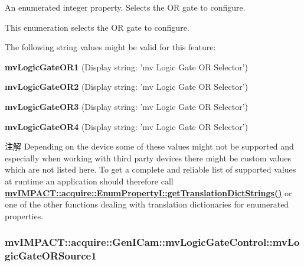 An enumerated integer property. Selects the O\+R gate to configure. 

This enumeration selects the O\+R gate to configure.

The following string values might be valid for this feature\+:
\begin{DoxyItemize}
\item {\bfseries mv\+Logic\+Gate\+O\+R1} (Display string\+: 'mv Logic Gate O\+R Selector')
\item {\bfseries mv\+Logic\+Gate\+O\+R2} (Display string\+: 'mv Logic Gate O\+R Selector')
\item {\bfseries mv\+Logic\+Gate\+O\+R3} (Display string\+: 'mv Logic Gate O\+R Selector')
\item {\bfseries mv\+Logic\+Gate\+O\+R4} (Display string\+: 'mv Logic Gate O\+R Selector')
\end{DoxyItemize}

\begin{DoxyNote}{注解}
Depending on the device some of these values might not be supported and especially when working with third party devices there might be custom values which are not listed here. To get a complete and reliable list of supported values at runtime an application should therefore call {\bfseries \hyperlink{classmv_i_m_p_a_c_t_1_1acquire_1_1_enum_property_i_a0ba6ccbf5ee69784d5d0b537924d26b6}{mv\+I\+M\+P\+A\+C\+T\+::acquire\+::\+Enum\+Property\+I\+::get\+Translation\+Dict\+Strings()}} or one of the other functions dealing with translation dictionaries for enumerated properties. 
\end{DoxyNote}
\hypertarget{classmv_i_m_p_a_c_t_1_1acquire_1_1_gen_i_cam_1_1mv_logic_gate_control_a7036f5051e1126c79f002edb61934005}{
\subsubsection[{mv\+Logic\+Gate\+O\+R\+Source1}]{ mv\+I\+M\+P\+A\+C\+T\+::acquire\+::\+Gen\+I\+Cam\+::mv\+Logic\+Gate\+Control\+::mv\+Logic\+Gate\+O\+R\+Source1}}\label{classmv_i_m_p_a_c_t_1_1acquire_1_1_gen_i_cam_1_1mv_logic_gate_control_a7036f5051e1126c79f002edb61934005}


